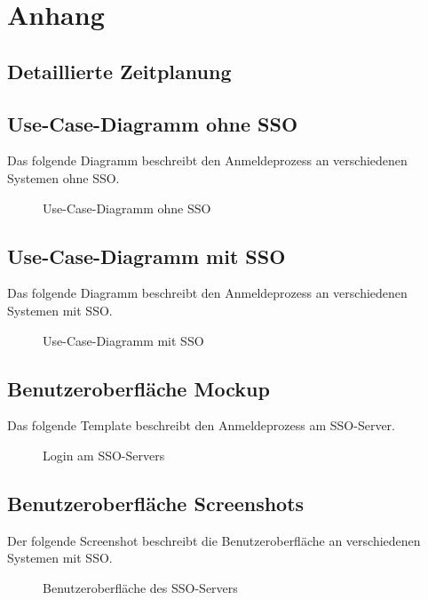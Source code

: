 \section{Anhang}
\subsection{Detaillierte Zeitplanung}
\label{app:Zeitplanung}





\clearpage

\subsection{Use-Case-Diagramm ohne SSO}
\label{app:Use-Case-Diagramm}
Das folgende Diagramm beschreibt den Anmeldeprozess an verschiedenen Systemen ohne \acs{SSO}.
\begin{figure}[htb]
\centering
{}
\caption{Use-Case-Diagramm ohne SSO}
\end{figure}
\clearpage

\subsection{Use-Case-Diagramm mit SSO}
\label{app:Use-Case-Diagramm2}
Das folgende Diagramm beschreibt den Anmeldeprozess an verschiedenen Systemen mit \acs{SSO}.
\begin{figure}[htb]
\centering
{}
\caption{Use-Case-Diagramm mit SSO}
\end{figure}
\clearpage

\subsection{Benutzeroberfläche Mockup}
\label{app:wyconnect-mockup}

Das folgende Template beschreibt den Anmeldeprozess am \acs{SSO}-Server.
\begin{figure}[htb]
\centering
{}
\caption{Login am SSO-Servers}
\end{figure}
\clearpage

\subsection{Benutzeroberfläche Screenshots}
\label{app:wyconnect-screenshots}
Der folgende Screenshot beschreibt die Benutzeroberfläche an verschiedenen Systemen mit \acs{SSO}.
\begin{figure}[htb]
\centering
{}
\caption{Benutzeroberfläche des SSO-Servers}
\end{figure}
\clearpage

